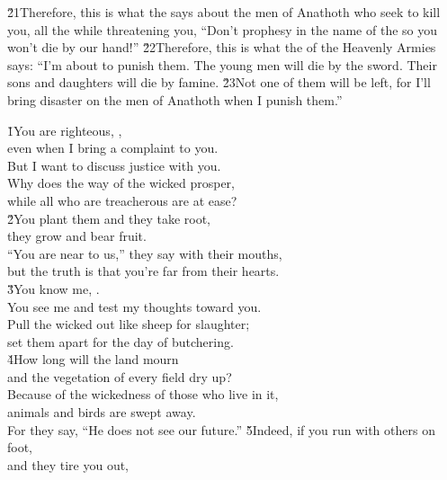 \v{21}Therefore, this is what the  says about the men of Anathoth who seek to kill you, all the while threatening you, ``Don't prophesy in the name of the  so you won't die by our hand!'' \v{22}Therefore, this is what the  of the Heavenly Armies says: ``I'm about to punish them. The young men will die by the sword. Their sons and daughters will die by famine. \v{23}Not one of them will be left, for I'll bring disaster on the men of Anathoth when I punish them.''

\begin{poetry}
\poeml {}
\v{1}You are righteous, , \\
\poeml even when I bring a complaint to you. \\
\poeml But I want to discuss justice with you. \\
\poemll    Why does the way of the wicked prosper, \\
\poemlll       while all who are treacherous are at ease? \\
\poeml \v{2}You plant them and they take root, \\
\poemll    they grow and bear fruit. \\
\poeml ``You are near to us,'' they say with their mouths, \\
\poemll    but the truth is that you're far from their hearts. \\
\poeml \v{3}You know me, . \\
\poemll    You see me and test my thoughts toward you. \\
\poeml Pull the wicked out like sheep for slaughter; \\
\poemll    set them apart for the day of butchering. \\
\poeml \v{4}How long will the land mourn \\
\poemll    and the vegetation of every field dry up? \\
\poeml Because of the wickedness of those who live in it, \\
\poemll    animals and birds are swept away. \\
\poemlll       For they say, ``He does not see our future.''
\poeml \v{5}Indeed, if you run with others on foot, \\
\poemll    and they tire you out, \\

\end{poetry}
